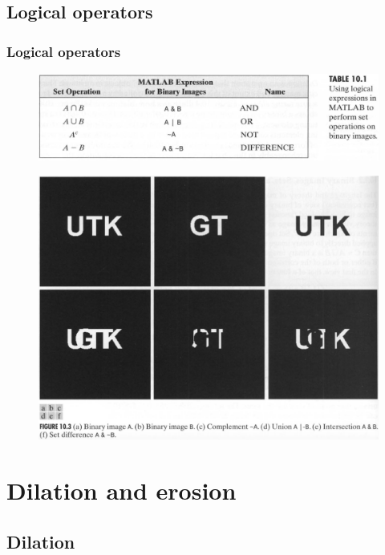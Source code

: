 \subsection{Logical operators}

\begin{frame}
\frametitle{Logical operators}
\begin{figure}[!h]
\includegraphics[width=\textwidth]{table-10-1.png}
\end{figure}
\begin{figure}[!h]
\includegraphics[width=.4\textwidth]{fig-10-3.png}
\end{figure}
\end{frame}

\section{Dilation and erosion}

\subsection{Dilation}

